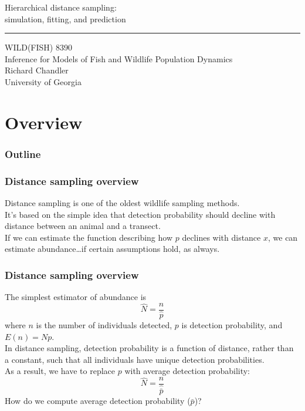 \documentclass[color=usenames,dvipsnames]{beamer}\usepackage[]{graphicx}\usepackage[]{xcolor}
\begin{document}
\begin{frame}[plain]
  \LARGE
  \centering
  {
    \huge Hierarchical distance sampling: \\
    \LARGE simulation, fitting, and prediction %
  }
  {\color{default} \rule{\textwidth}{0.1pt} }
  \vfill
  \large
  WILD(FISH) 8390 \\
  Inference for Models of Fish and Wildlife Population Dynamics \\
  \vfill
  \large
  Richard Chandler \\
  University of Georgia \\
\end{frame}






\section{Overview}



\begin{frame}[plain]
  \frametitle{Outline}
  \Large
\end{frame}



\begin{frame}
  \frametitle{Distance sampling overview}
  Distance sampling is one of the oldest wildlife sampling methods. \\
  \pause
  \vfill
  It's based on the simple idea that detection probability should
  decline with distance between an animal and a transect. \\
  \pause
  \vfill
  If we can estimate the function describing how $p$ declines with
  distance $x$, we can estimate abundance\dots if certain
  assumptions hold, as always. \\
\end{frame}



\begin{frame}
  \frametitle{Distance sampling overview}
  The simplest estimator of abundance is 
  \[
    \hat{N} = \frac{n}{\hat{p}}
  \]
  where $n$ is the number of individuals detected, $p$ is detection
  probability, and $E(n)=Np$. \\
  \pause
  \vfill
  In distance sampling, detection probability is a \alert{function} of
  distance, rather than a constant, such that all individuals have
  unique detection probabilities. \\
  \pause
  \vfill
  As a result, we have to replace
  $p$ with \alert{average} detection probability:
  \[
    \hat{N} = \frac{n}{\hat{\bar{p}}}
  \]
  \pause
  \vfill
  How do we compute average detection probability ($\bar{p}$)?
\end{frame}
\end{document}
